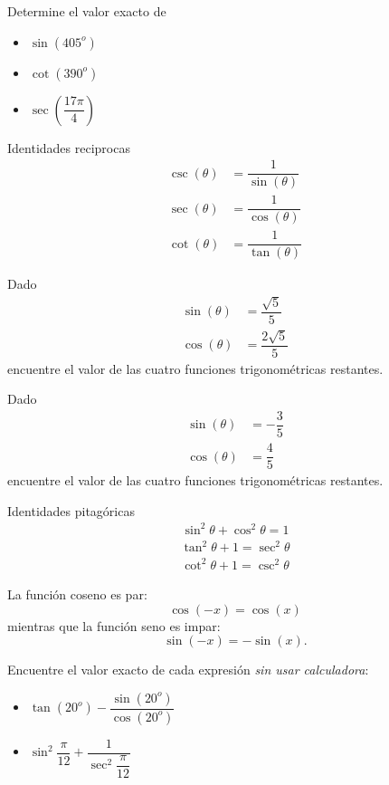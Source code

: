 {}
	\begin{problema}
		Determine el valor exacto de 
		\begin{itemize}
			\item $\sin(405^{o})$
			\item $\cot(390^{o})$
			\item $\sec\left( \dfrac{17\pi}{4} \right)$
		\end{itemize}
		
	\end{problema}
	

{Identidades reciprocas}
	\begin{align}
		\label{sull632}
		\csc(\theta)&= \dfrac{1}{\sin(\theta)}\\
		\sec(\theta)&= \dfrac{1}{\cos(\theta)}\\
		\cot(\theta)&= \dfrac{1}{\tan(\theta)}
	\end{align}

{}
	\begin{problema}
		\label{exmp:6303}
		Dado 
		\begin{align*}
			\sin(\theta)&= \dfrac{\sqrt{5}}{5}\\
			\cos(\theta)&= \dfrac{2\sqrt{5}}{5}
		\end{align*}
		encuentre el valor de las cuatro funciones trigonométricas restantes.
	\end{problema}
	

{}
	\begin{problema}
		\label{exe:6335}
		Dado 
		\begin{align*}
			\sin(\theta)&= -\dfrac{3}{5}\\
			\cos(\theta)&= \dfrac{4}{5}
		\end{align*}
		encuentre el valor de las cuatro funciones trigonométricas restantes.
	\end{problema}
	

{Identidades pitagóricas}
	\begin{align*}
		\sin^{2}\theta+\cos^{2}\theta=1
	\end{align*} 
	\begin{align*}
		\tan^{2}\theta + 1 = \sec^{2}\theta
	\end{align*} 
	\begin{align*}
		\cot^{2}\theta + 1 =\csc^{2}\theta
	\end{align*}


	La función coseno es par:
	$$ \cos(-x)=\cos(x) $$
	mientras que la función seno es impar:
	$$ \sin(-x)=-\sin(x) .$$

{}
	\begin{problema}
		\label{exmp:6304}
		Encuentre el valor exacto de cada expresión \emph{sin usar calculadora}:
		\begin{itemize}
			\item $\tan(20^{o})-\dfrac{\sin(20^{o})}{\cos(20^{o})}$ 
			\item $\sin^{2}\dfrac{\pi}{12}+\dfrac{1}{\sec^{2}\dfrac{\pi}{12}}$
		\end{itemize}
		
	\end{problema}
	

